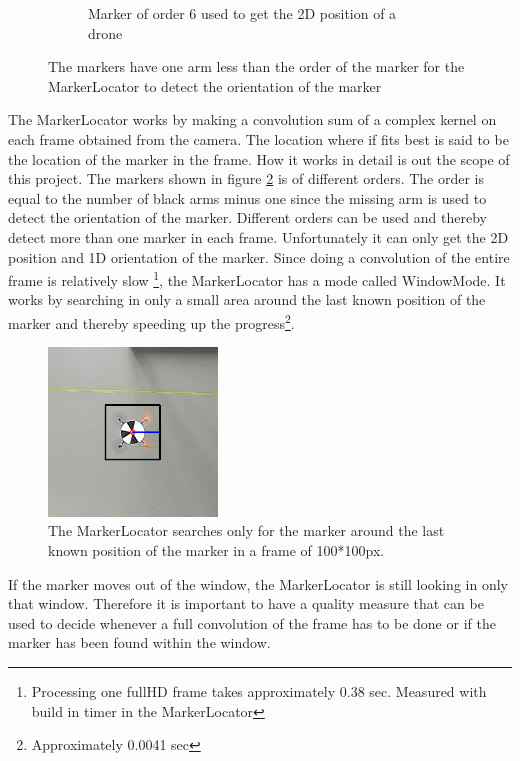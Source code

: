 \begin{figure}[H]
\begin{subfigure}[b]{0.2\textwidth}
        \caption{Marker of order 6 used to get the 2D position of a drone}
        \label{fig:markerlocator_order_4}
    \end{subfigure}
    \caption{The markers have one arm less than the order of the marker for the MarkerLocator to detect the orientation of the marker}\label{fig:markerlocator_marker}
\end{figure}




The MarkerLocator works by making a convolution sum of a complex kernel on each frame obtained from the camera.
The location where if fits best is said to be the location of the marker in the frame.
How it works in detail is out the scope of this project.
The markers shown in figure \ref{fig:markerlocator_marker} is of different orders.
The order is equal to the number of black arms minus one since the missing arm is used to detect the orientation of the marker. 
Different orders can be used and thereby detect more than one marker in each frame. Unfortunately it can only get the 2D position and 1D orientation of the marker.
Since doing a convolution of the entire frame is relatively slow \footnote{Processing one fullHD frame takes approximately 0.38 sec. Measured with build in timer in the MarkerLocator}, the MarkerLocator has a mode called WindowMode.
It works by searching in only a small area around the last known position of the marker and thereby speeding up the progress\footnote{Approximately 0.0041 sec}. 

\begin{figure}[H]
    \center
    \includegraphics[width=0.4\textwidth]{graphics/markerlocator_window.png}
  	\caption{The MarkerLocator searches only for the marker around the last known position of the marker in a frame of 100*100px.}
    \label{markerlocator_windowmode}
\end{figure}
If the marker moves out of the window, the MarkerLocator is still looking in only that window.
Therefore it is important to have a quality measure that can be used to decide whenever a full convolution of the frame has to be done or if the marker has been found within the window. 

